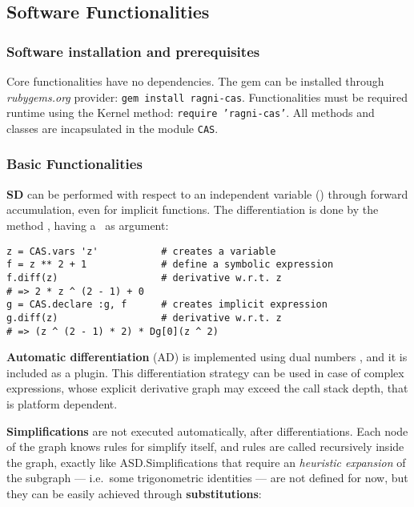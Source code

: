 \subsection{Software Functionalities}
\label{sec:functionalities}

\subsubsection{Software installation and prerequisites}

Core functionalities have no dependencies. The gem can be installed through \emph{rubygems.org} provider: \texttt{gem install ragni-cas}. Functionalities must be required runtime using the Kernel method: \texttt{require 'ragni-cas'}. All methods and classes are incapsulated in the module \texttt{CAS}.

\subsubsection{Basic Functionalities}
\textbf{SD} can be performed with respect to an independent variable (\CASVariable) through forward accumulation, even for implicit functions. The differentiation is done by the method \CASOpdiff, having a \CASVariable~as argument:

\noindent%
\begin{lstlisting}[caption={Differentiation example},label={code:example-diff}]
z = CAS.vars 'z'           # creates a variable
f = z ** 2 + 1             # define a symbolic expression
f.diff(z)                  # derivative w.r.t. z
# => 2 * z ^ (2 - 1) + 0
g = CAS.declare :g, f      # creates implicit expression
g.diff(z)                  # derivative w.r.t. z
# => (z ^ (2 - 1) * 2) * Dg[0](z ^ 2)
\end{lstlisting}

\textbf{Automatic differentiation} (AD) is implemented using dual numbers \cite{bartholomew2000automatic}, and it is included as a plugin. This differentiation strategy can be used in case of complex expressions, whose explicit derivative graph may exceed the call stack depth, that is platform dependent.

\textbf{Simplifications} are not executed automatically, after differentiations. Each node of the graph knows rules for simplify itself, and rules are called recursively inside the graph, exactly like ASD.\@ Simplifications that require an \emph{heuristic expansion} of the subgraph --- i.e.\ some trigonometric identities --- are not defined for now, but they can be easily achieved through \textbf{substitutions}:

